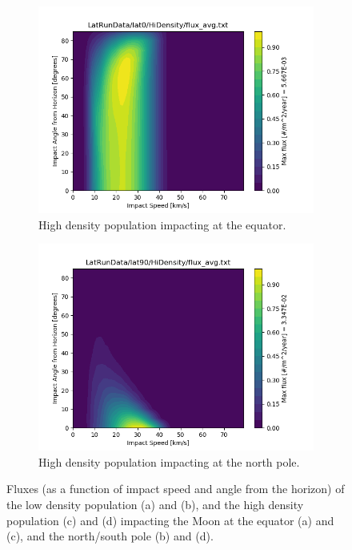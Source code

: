 \documentclass{hitec}
\numberwithin{equation}{section}
\begin{document}
\begin{figure}[h!]
\begin{subfigure}{.47\textwidth}
		\includegraphics[width=.85\linewidth]{../HiDensity018_lat0.png}  
		\caption{High density population impacting at the equator.}
		\label{fig:sub-HiDensity018_lat0}
	\end{subfigure}
	\begin{subfigure}{.47\textwidth}
		\centering
		\includegraphics[width=.85\linewidth]{../HiDensity036_lat90.png}  
		\caption{High density population impacting at the north pole.}
		\label{fig:sub-HiDensity036_lat90}
	\end{subfigure}
	\caption{Fluxes (as a function of impact speed and angle from the horizon) of the low density population (a) and (b), and the high density population (c) and (d) impacting the Moon at the equator (a) and (c), and the north/south pole (b) and (d).}
	\label{fig:latitudinal_dependence}
\end{figure}
\end{document}
